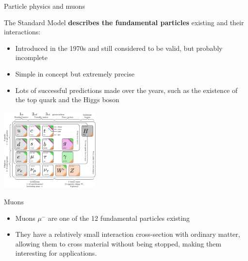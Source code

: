 \documentclass[handout,8 pt]{beamer}
\begin{document}
\begin{frame}{Particle physics and muons}

\begin{minipage}[c]{.54\textwidth}
The Standard Model \textbf{describes the fundamental particles} existing and their interactions:
\begin{itemize}
	\justifying
	\item Introduced in the 1970s and still considered to be valid, but probably incomplete
	\item Simple in concept but extremely precise
	\item Lots of successful predictions made over the years, such as the existence of the top quark and the Higgs boson
\end{itemize}
\end{minipage} \hfill
\begin{minipage}[c]{.42\textwidth}
	\includegraphics[width=5cm, height=4.2cm]{figs/SMFermions.png}
\end{minipage} \hfill \vfill

\begin{exampleblock}{} Muons \end{exampleblock}
\begin{itemize}
	\justifying
	\item Muons $\mu^-$ are one of the 12 fundamental particles existing
	\item They have a relatively small interaction cross-section with ordinary matter, allowing them to cross material without being stopped, making them interesting for applications.
\end{itemize} \vfill
\end{frame}
\end{document}
